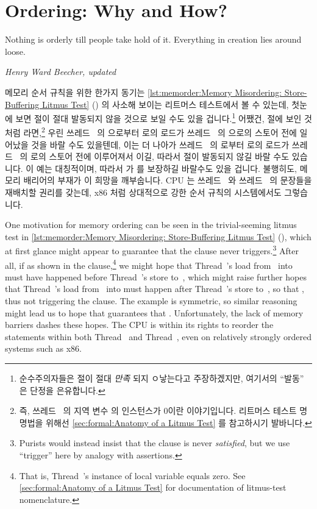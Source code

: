 \section{Ordering: Why and How?}
\label{sec:memorder:Ordering: Why and How?}
%
\epigraph{Nothing is orderly till people take hold of it.
	  Everything in creation lies around loose.}
	 {\emph{Henry Ward Beecher, updated}}

메모리 순서 규칙을 위한 한가지 동기는
\cref{lst:memorder:Memory Misordering: Store-Buffering Litmus Test}
() 의 사소해 보이는 리트머스 테스트에서 볼 수 있는데,
첫눈에 보면  절이 절대 발동되지 않을 것으로 보일 수도 있을
겁니다.\footnote{
	순수주의자들은  절이 절대 \emph{만족} 되지 ㅇ낳는다고
	주장하겠지만, 여기서의 ``발동'' 은 단정을 은유합니다.}
어쨌건,  절에 보인 것처럼  라면,\footnote{
	즉, 쓰레드~ 의 지역 변수  의 인스턴스가 0이란
	이야기입니다.
	리트머스 테스트 명명법을 위해선
	\cref{sec:formal:Anatomy of a Litmus Test} 를 참고하시기 발바니다.}
우린 쓰레드~ 의  으로부터  로의 로드가 쓰레드~
의  으로의 스토어 전에 일어났을 것을 바랄 수도 있을텐데, 이는 더 나아가
쓰레드~ 의  로부터  로의 로드가 쓰레드~ 의
 로의 스토어 전에 이루어져서  이길, 따라서  절이
발동되지 않길 바랄 수도 있습니다.
이 예는 대칭적이며, 따라서  가  를 보장하길 바랄수도
있을 겁니다.
불행히도, 메모리 배리어의 부재가 이 희망을 깨부숩니다.
CPU 는 쓰레드~ 와 쓰레드~ 의 문장들을 재배치할 권리를 갖는데,
x86 처럼 상대적으로 강한 순서 규칙의 시스템에서도 그렇습니다.

\iffalse

One motivation for memory ordering can be seen in the trivial-seeming
litmus test in
\cref{lst:memorder:Memory Misordering: Store-Buffering Litmus Test}
(),
which at first glance might
appear to guarantee that the  clause never triggers.\footnote{
	Purists would instead insist that the  clause is
	never \emph{satisfied}, but we use ``trigger'' here by
	analogy with assertions.}
After all, if  as shown in the  clause,\footnote{
	That is, Thread~'s instance of local variable 
	equals zero.
	See \cref{sec:formal:Anatomy of a Litmus Test}
	for documentation of litmus-test nomenclature.}
we might hope that Thread~'s load from~ into 
must have happened before Thread~'s store to~, which
might raise further hopes that Thread~'s load from~
into  must happen after Thread~'s store to~,
so that , thus not triggering the  clause.
The example is symmetric, so similar reasoning might lead
us to hope that  guarantees that .
Unfortunately, the lack of memory barriers dashes these hopes.
The CPU is within its rights to reorder
the statements within both Thread~ and Thread~,
even on relatively strongly ordered systems such as x86.

